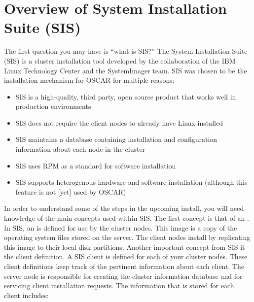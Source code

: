 %
% 
%
%
%

\section{Overview of System Installation Suite (SIS)}
\label{sec:sis}

The first question you may have is ``what is SIS?'' The System
Installation Suite (SIS) is a cluster installation tool developed by
the collaboration of the IBM Linux Technology Center and the
SystemImager team.  SIS was chosen to be the installation mechanism
for OSCAR for multiple reasons:

\begin{itemize}
\item SIS is a high-quality, third party, open source product that
  works well in production environments

\item SIS does not require the client nodes to already have Linux
  installed
  
\item SIS maintains a database containing installation and
  configuration information about each node in the cluster

\item SIS uses RPM as a standard for software installation
  
\item SIS supports heterogenous hardware and software installation
  (although this feature is not [yet] used by OSCAR)
\end{itemize}

In order to understand some of the steps in the upcoming install, you
will need knowledge of the main concepts used within SIS. The first
concept is that of an . In SIS, an  is defined
for use by the cluster nodes. This image is a copy of the operating
system files stored on the server. The client nodes install by
replicating this image to their local disk partitions. Another
important concept from SIS it the client definition.  A SIS client is
defined for each of your cluster nodes.  These client definitions keep
track of the pertinent information about each client.  The server node
is responsible for creating the cluster information database and for
servicing client installation requests.  The information that is
stored for each client includes:


